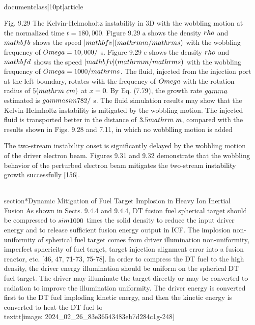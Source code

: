 \\documentclass[10pt]{article}
\begin{document}
{{{{{{Fig. 9.29 The Kelvin-Helmoholtz instability in 3D with the wobbling motion at the normalized time $t=180,000$. Figure 9.29 a shows the density $\\rho$ and $\\mathbf{b}$ shows the speed $|\\mathbf{v}|(\\mathrm{m} / \\mathrm{s})$ with the wobbling frequency of $\\Omega=10,000 /$ s. Figure 9.29 c shows the density $\\rho$ and $\\mathbf{d}$ shows the speed $|\\mathbf{v}|(\\mathrm{m} / \\mathrm{s})$ with the wobbling frequency of $\\Omega=1000 / \\mathrm{s}$. The fluid, injected from the injection port at the left boundary, rotates with the frequency of $\\Omega$ with the rotation radius of $5(\\mathrm{~cm})$ at $x=0$. By Eq. (7.79), the growth rate $\\gamma$ estimated is $\\gamma \\sim 782 /$ s. The fluid simulation results may show that the Kelvin-Helmholtz instability is mitigated by the wobbling motion. The injected fluid is transported better in the distance of $3.5 \\mathrm{~m}$, compared with the results shown in Figs. 9.28 and 7.11, in which no wobblling motion is added

The two-stream instability onset is significantly delayed by the wobbling motion of the driver electron beam. Figures 9.31 and 9.32 demonstrate that the wobbling behavior of the perturbed electron beam mitigates the two-stream instability growth successfully [156].

\\section*{Dynamic Mitigation of Fuel Target Implosion in Heavy Ion Inertial Fusion}
As shown in Sects. 9.4.4 and 9.4.4, DT fusion fuel spherical target should be compressed to $\\sim 1000$ times the solid density to reduce the input driver energy and to release sufficient fusion energy output in ICF. The implosion non-uniformity of spherical fuel target comes from driver illumination non-uniformity, imperfect sphericity of fuel target, target injection alignment error into a fusion reactor, etc. [46, 47, 71-73, 75-78]. In order to compress the DT fuel to the high density, the driver energy illumination should be uniform on the spherical DT fuel target. The driver may illuminate the target directly or may be converted to radiation to improve the illumination uniformity. The driver energy is converted first to the DT fuel imploding kinetic energy, and then the kinetic energy is converted to heat the DT fuel to
\\texttt{[image: 2024\_02\_26\_83e36543483eb7d284c1g-248]}

}}}}}}
\end{document}
